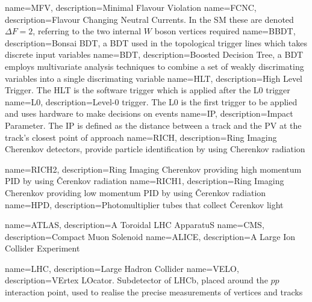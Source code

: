 {
	name=MFV,
		description={Minimal Flavour Violation}
}
{
	name=FCNC,
		description={Flavour Changing Neutral Currents. In the \Gls{SM} these are denoted $\Delta F = 2$, referring to the two internal $W$ boson vertices required}}
{
	name=BBDT,
		description={Bonsai BDT, a BDT used in the topological trigger lines which takes discrete input variables}}
{
	name=BDT,
		description={Boosted Decision Tree, a BDT employs multivariate analysis techniques to combine a set of weakly discrimating variables into a single discrimating variable}}                   
{
	name=HLT,
		description={High Level Trigger. The HLT is the software trigger which is applied after the \Gls{L0} trigger}}
{
	name=L0,
		description={Level-0 trigger. The L0 is the first trigger to be applied and uses hardware to make decisions on events  }}                   
{
	name=IP,
		description={Impact Parameter. The IP is defined as the distance between a track and the \Gls{PV} at the track's closest point of approach }}                                                                        
{
	name=RICH,
		description={Ring Imaging Cherenkov detectors, provide particle identification by using Cherenkov radiation}                         
}

{
	name=RICH2,
		description={Ring Imaging Cherenkov providing high momentum \gls{PID} by using Čerenkov radiation}                         
}
{
	name=RICH1,
		description={Ring Imaging Cherenkov providing low momentum \gls{PID} by using Čerenkov radiation}                         
}
{
	name=HPD,
		description={Photomultiplier tubes that collect Čerenkov light}
}

{
	name=ATLAS,
		description={A Toroidal LHC ApparatuS}
}
{
	name=CMS,
		description={Compact Muon Solenoid}
}
{
	name=ALICE,
		description={A Large Ion Collider Experiment}
}

{
	name=LHC,
		description={Large Hadron Collider}
}
{
	name=VELO,
		description={VErtex LOcator. Subdetector of LHCb, placed around the $pp$ interaction point, used to realise the precise measurements of vertices and tracks}
}

